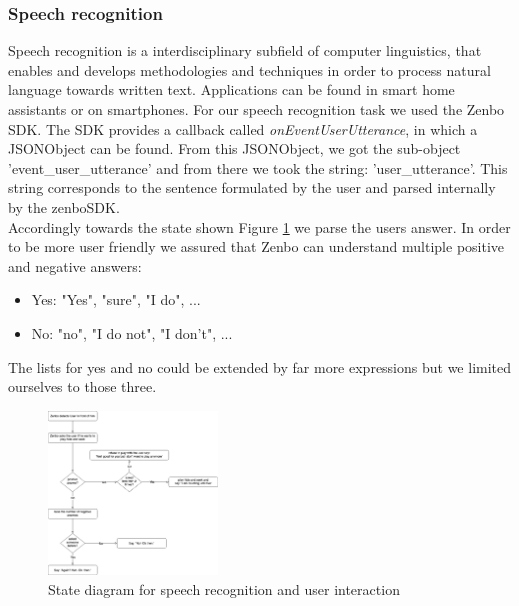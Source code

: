 \documentclass[conference]{IEEEtran}
\begin{document}
\subsubsection{Speech recognition} \label{sec:speechreconition}
Speech recognition is a interdisciplinary subfield of computer linguistics, that enables and develops methodologies and techniques in order to process 
natural language towards written text. \cite{b4}  Applications can be found in smart home assistants or on smartphones.
For our speech recognition task we used the Zenbo SDK. The SDK provides a callback called \textit{onEventUserUtterance}, in which a JSONObject can be found.
From this JSONObject, we got the sub-object 'event\_user\_utterance' and from there we took the string: 'user\_utterance'. This string 
corresponds to the sentence formulated by the user and parsed internally by the zenboSDK.\\
Accordingly towards the state shown Figure \ref{fig:zenboSpeech} we parse the users answer.
In order to be more user friendly we assured that Zenbo can understand multiple positive and negative answers:
\begin{itemize}
	\item Yes: "Yes", "sure", "I do", ...
	\item No: "no", "I do not", "I don't", ...
\end{itemize}
The lists for yes and no could be extended by far more expressions but we limited ourselves to those three.\\
\begin{figure}  \label{fig:zenboSpeech}
	\begin{center}
		\includegraphics[width=0.4\textwidth]{pics/ZenboSpeech.png}
	\end{center}
	\caption{State diagram for speech recognition and user interaction}
\end{figure}\\
\end{document}
